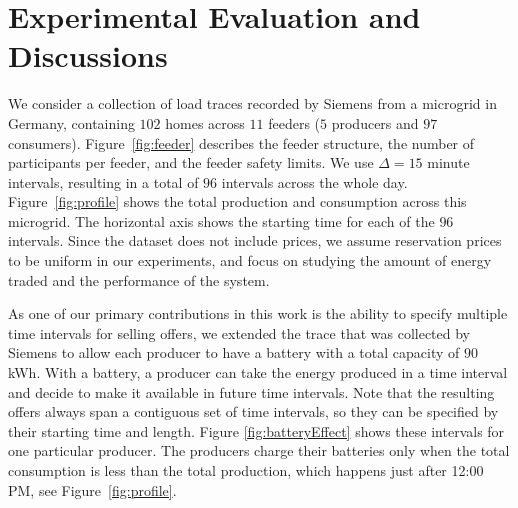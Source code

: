 \section{Experimental Evaluation and Discussions}
\label{sec:results}

We consider a collection of load traces recorded by Siemens from a microgrid in Germany, containing $102$ homes across $11$ feeders ($5$ producers and $97$ consumers). %
Figure~\ref{fig:feeder} describes the feeder structure, the number of participants per feeder, and  the feeder safety limits. We use $\Delta =15$ minute intervals, resulting in a total of $96$ intervals across the whole day.   Figure~\ref{fig:profile} shows the total production and consumption across this microgrid. The horizontal axis shows the starting time for each of the $96$ intervals. 
Since the dataset does not include prices, we assume reservation prices to be uniform in our experiments, and focus on studying the amount of energy traded and the performance of the system.

As one of our primary contributions in this work is the ability to specify multiple time intervals for  selling offers, we extended the trace that was collected by Siemens to allow each producer to have a battery with a total capacity of $90$ kWh. With a battery, a producer can take the energy produced in  a time interval and decide to make it available in future time intervals.
Note that the resulting offers always span a contiguous set of time intervals, so they can be specified by their starting time and length. 
Figure \ref{fig:batteryEffect} shows these intervals for one particular producer. The producers charge their batteries only when the total consumption is less than the total production, which happens just after 12:00 PM, see Figure~\ref{fig:profile}.








